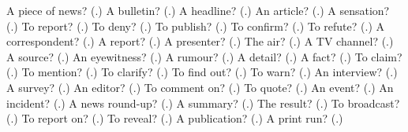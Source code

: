 \begin{tcolorbox}[breakable,colback=teal!4,colframe=teal!35!black,title={Before you move on}]
A piece of news? (\textbf{}.) A bulletin? (\textbf{}.) A headline? (\textbf{}.) An article? (\textbf{}.) A sensation? (\textbf{}.) To report? (\textbf{}.) To deny? (\textbf{}.) To publish? (\textbf{}.) To confirm? (\textbf{}.) To refute? (\textbf{}.) A correspondent? (\textbf{}.) A report? (\textbf{}.) A presenter? (\textbf{}.) The air? (\textbf{}.) A TV channel? (\textbf{}.) A source? (\textbf{}.) An eyewitness? (\textbf{}.) A rumour? (\textbf{}.) A detail? (\textbf{}.) A fact? (\textbf{}.) To claim? (\textbf{}.) To mention? (\textbf{}.) To clarify? (\textbf{}.) To find out? (\textbf{}.) To warn? (\textbf{}.) An interview? (\textbf{}.) A survey? (\textbf{}.) An editor? (\textbf{}.) To comment on? (\textbf{}.) To quote? (\textbf{}.) An event? (\textbf{}.) An incident? (\textbf{}.) A news round-up? (\textbf{}.) A summary? (\textbf{}.) The result? (\textbf{}.) To broadcast? (\textbf{}.) To report on? (\textbf{}.) To reveal? (\textbf{}.) A publication? (\textbf{}.) A print run? (\textbf{}.)
\end{tcolorbox}
